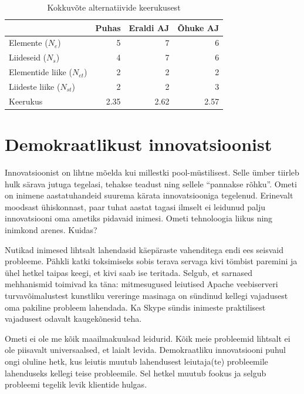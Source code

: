 \begin{table}
	\begin{center}
		\begin{tabular}{p{3.6 cm}rrr}
		\toprule
& Puhas & Eraldi AJ & Õhuke AJ \\
		\midrule
Elemente ($N_e$) &	5 &	7 &	6\\
Liideseid  ($N_s$)	& 4 &	7 &	6\\
Elementide liike  ($N_{et}$)&	2	&2	&2\\
Liideste liike  ($N_{st}$)&	2 &	2 &	3\\
		\midrule
Keerukus &	2.35 &	2.62	 &2.57\\
		\bottomrule
		\end{tabular}
		\caption{Kokkuvõte alternatiivide keerukusest}
		\label{tab:complexity}

	\end{center}
\end{table}

\section{Demokraatlikust innovatsioonist}
Innovatsioonist on lihtne mõelda kui millestki pool-müstilisest. Selle ümber tiirleb hulk särava jutuga tegelasi, tehakse teadust ning sellele \enquote{pannakse rõhku}. Ometi on inimene aastatuhandeid suurema kärata innovatsiooniga tegelenud. Erinevalt moodsast ühiskonnast, paar tuhat aastat tagasi ilmselt ei leidunud palju innovatsiooni oma ametiks pidavaid inimesi. Ometi tehnoloogia liikus ning inimkond arenes. Kuidas?

Nutikad inimesed lihtsalt lahendasid käepäraste vahenditega endi ees seisvaid probleeme. Pähkli katki toksimiseks sobis terava servaga kivi tömbist paremini ja ühel hetkel taipas keegi, et kivi saab ise teritada. Selgub\cite{hippel}, et sarnased mehhanismid toimivad ka täna: mitmesugused leiutised Apache veebiserveri turvavõimalustest kunstliku vereringe masinaga on sündinud kellegi vajadusest oma pakiline probleem lahendada. Ka Skype sündis inimeste praktilisest vajadusest odavalt kaugekõnesid teha. 

Ometi ei ole me kõik maailmakuulsad leidurid. Kõik meie probleemid lihtsalt ei ole piisavalt universaalsed, et laialt levida. Demokraatliku innovatsiooni puhul ongi oluline hetk, kus leiutis muutub lahendusest leiutaja(te) probleemile lahenduseks kellegi teise probleemile. Sel hetkel muutub fookus ja selgub probleemi tegelik levik klientide hulgas. 

